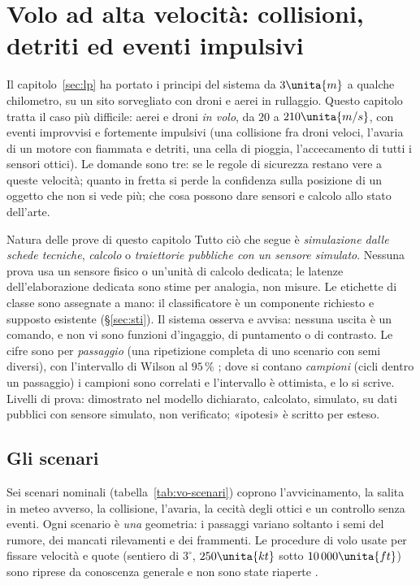 \section{Volo ad alta velocità: collisioni, detriti ed eventi impulsivi}\label{sec:vo}

Il capitolo~\ref{sec:lp} ha portato i principi del sistema da $3\unita{m}$ a qualche chilometro, su un sito sorvegliato con droni e aerei in rullaggio. Questo capitolo tratta il caso più difficile: aerei e droni \emph{in volo}, da $20$ a $210\unita{m/s}$, con eventi improvvisi e fortemente impulsivi (una collisione fra droni veloci, l'avaria di un motore con fiammata e detriti, una cella di pioggia, l'accecamento di tutti i sensori ottici). Le domande sono tre: se le regole di sicurezza restano vere a queste velocità; quanto in fretta si perde la confidenza sulla posizione di un oggetto che non si vede più; che cosa possono dare sensori e calcolo allo stato dell'arte.

\begin{riquadro}{Natura delle prove di questo capitolo}
Tutto ciò che segue è \emph{simulazione dalle schede tecniche}, \emph{calcolo} o \emph{traiettorie pubbliche con un sensore simulato}. Nessuna prova usa un sensore fisico o un'unità di calcolo dedicata; le latenze dell'elaborazione dedicata sono stime per analogia, non misure. Le etichette di classe sono assegnate a mano: il classificatore è un componente richiesto e supposto esistente (\S\ref{sec:sti}). Il sistema osserva e avvisa: nessuna uscita è un comando, e non vi sono funzioni d'ingaggio, di puntamento o di contrasto. Le cifre sono per \emph{passaggio} (una ripetizione completa di uno scenario con semi diversi), con l'intervallo di Wilson al $95\,\%$ \cite{wilson1927}; dove si contano \emph{campioni} (cicli dentro un passaggio) i campioni sono correlati e l'intervallo è ottimista, e lo si scrive. Livelli di prova:  dimostrato nel modello dichiarato,  calcolato,  simulato,  su dati pubblici con sensore simulato,  non verificato; «ipotesi» è scritto per esteso.
\end{riquadro}

\subsection{Gli scenari}\label{sec:vo-scenari}

Sei scenari nominali (tabella~\ref{tab:vo-scenari}) coprono l'avvicinamento, la salita in meteo avverso, la collisione, l'avaria, la cecità degli ottici e un controllo senza eventi. Ogni scenario è \emph{una} geometria: i passaggi variano soltanto i semi del rumore, dei mancati rilevamenti e dei frammenti. Le procedure di volo usate per fissare velocità e quote (sentiero di $3^\circ$, $250\unita{kt}$ sotto $10\,000\unita{ft}$) sono riprese da conoscenza generale e non sono state riaperte .

